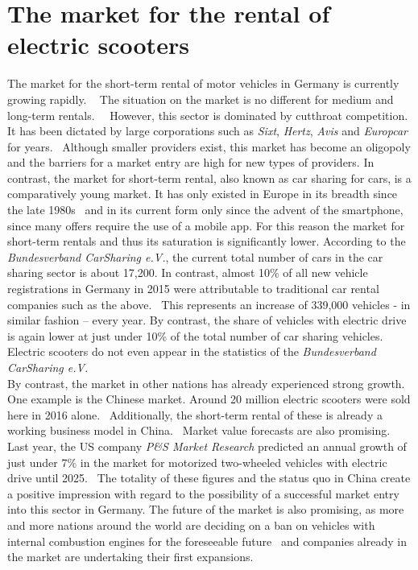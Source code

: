 \documentclass[12pt,a4paper]{report}
\begin{document}
\section{The market for the rental of electric scooters}

The market for the short-term rental of motor vehicles in Germany is currently growing rapidly.
~\cite{bundesverband-carsharing-statistics}
The situation on the market is no different for medium and long-term rentals.
~\cite{sparkasse-kfz-vermietung}~However, this sector is dominated by cutthroat competition.
It has been dictated by large corporations such as \textit{Sixt}, \textit{Hertz},
\textit{Avis} and \textit{Europcar} for years.~\cite{sparkasse-kfz-vermietung}
Although smaller providers exist, this market has become an oligopoly and
the barriers for a market entry are high for new types of providers.
In contrast, the market for short-term rental, also known as car sharing for cars,
is a comparatively young market. It has only existed in Europe in its breadth
since the late 1980s~\cite{history-of-carsharing} and in its current form
only since the advent of the smartphone, since many offers require the use of a mobile app.
For this reason the market for short-term rentals and thus its saturation is significantly lower.
According to the \textit{Bundesverband CarSharing e.V.}, the current total number of cars
in the car sharing sector is about 17,200. In contrast, almost 10\% of all
new vehicle registrations in Germany in 2015 were attributable to traditional
car rental companies such as the above.~\cite{sparkasse-kfz-vermietung}
This represents an increase of 339,000 vehicles - in similar fashion – every year.
By contrast, the share of vehicles with electric drive is again lower at
just under 10\% of the total number of car sharing vehicles.
Electric scooters do not even appear in the statistics of the
\textit{Bundesverband CarSharing e.V.}~\cite{bundesverband-carsharing-statistics}\\
By contrast, the market in other nations has already experienced strong growth.
One example is the Chinese market. Around 20 million electric scooters were sold
here in 2016 alone.~\cite{heise-electric-scooters}
Additionally, the short-term rental of these is already a working business model
in China.~\cite{allchinatech-electric-scooters} Market value forecasts are also promising.
Last year, the US company \textit{P\&S Market Research} predicted an annual growth of
just under 7\% in the market for motorized two-wheeled vehicles with
electric drive until 2025.~\cite{pands-electric-scooters}
The totality of these figures and the status quo in China create a positive impression
with regard to the possibility of a successful market entry into this sector in Germany.
The future of the market is also promising, as more and more nations around the world
are deciding on a ban on vehicles with internal combustion engines for the
foreseeable future~\cite{faz-combustion-engine-ban} and companies already
in the market are undertaking their first expansions.
~\cite{allchinatech-electric-scooters, faz-electric-scooters}
\end{document}
